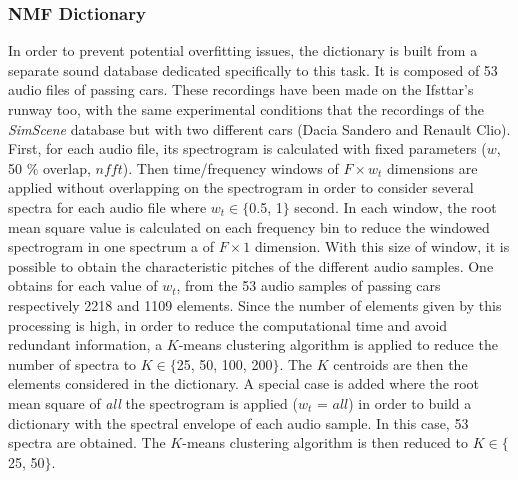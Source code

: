 \documentclass[twocolumn,a4paper,10pt]{article}
\begin{document}
\subsubsection{NMF Dictionary}\label{part:dictionary_learning}

In order to prevent potential overfitting issues, the dictionary is built from a separate sound database dedicated specifically to this task. It is composed of 53 audio files of passing cars. These recordings have been made on the Ifsttar's runway too, with the same experimental conditions that the recordings of the \textit{SimScene} database but with two different cars (Dacia Sandero and Renault Clio). First, for each audio file, its spectrogram is calculated with fixed parameters ($w$, 50 $\%$ overlap, $nfft$). Then time/frequency windows of $F \times w_t $ dimensions are applied without overlapping on the spectrogram in order to consider several spectra for each audio file where $w_t \in \lbrace$0.5, 1$\rbrace$ second. In each window, the root mean square value is calculated on each frequency bin to reduce the windowed spectrogram in one spectrum a of $F \times 1$ dimension. With this size of window, it is possible to obtain the characteristic pitches of the different audio samples. One obtains for each value of $w_t$, from the 53 audio samples of passing cars respectively 2218 and 1109 elements. Since the number of elements given by this processing is high, in order to reduce the computational time and avoid redundant information, a $K$-means clustering algorithm is applied to reduce the number of spectra to $K \in \lbrace$25, 50, 100, 200$\rbrace$. The $K$ centroids are then the elements considered in the dictionary. A special case is added where the root mean square of \textit{all} the spectrogram is applied ($w_t$ = $all$) in order to build a dictionary with the spectral envelope of each audio sample. In this case, 53 spectra are obtained. The $K$-means clustering algorithm is then reduced to $K \in \lbrace$25, 50$\rbrace$.
\end{document}
